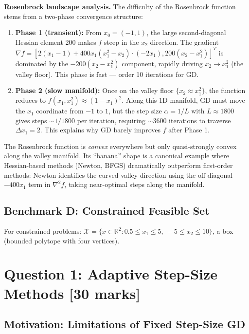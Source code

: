 \documentclass[11pt,a4paper]{article}
\theoremstyle{definition}
\begin{document}
\noindent\textbf{Rosenbrock landscape analysis.} The difficulty of the Rosenbrock function stems from a two-phase convergence structure:
\begin{enumerate}
\item \textbf{Phase 1 (transient):} From $x_0 = (-1,1)$, the large second-diagonal Hessian element $200$ makes $f$ steep in the $x_2$ direction. The gradient $\nabla f = [2(x_1-1) + 400x_1(x_1^2-x_2)\cdot(-2x_1), 200(x_2-x_1^2)]^T$ is dominated by the $-200(x_2-x_1^2)$ component, rapidly driving $x_2 \to x_1^2$ (the valley floor). This phase is fast --- order 10 iterations for GD.
\item \textbf{Phase 2 (slow manifold):} Once on the valley floor $\{x_2 \approx x_1^2\}$, the function reduces to $f(x_1, x_1^2) \approx (1-x_1)^2$. Along this 1D manifold, GD must move the $x_1$ coordinate from $-1$ to $1$, but the step size $\alpha = 1/L$ with $L \approx 1800$ gives steps $\sim 1/1800$ per iteration, requiring $\sim 3600$ iterations to traverse $\Delta x_1 = 2$. This explains why GD barely improves $f$ after Phase 1.
\end{enumerate}
The Rosenbrock function is \emph{convex} everywhere but only quasi-strongly convex along the valley manifold. Its ``banana'' shape is a canonical example where Hessian-based methods (Newton, BFGS) dramatically outperform first-order methods: Newton identifies the curved valley direction using the off-diagonal $-400x_1$ term in $\nabla^2 f$, taking near-optimal steps along the manifold.

\subsection{Benchmark D: Constrained Feasible Set}
For constrained problems: $\mathcal{X} = \{x \in \mathbb{R}^2 : 0.5 \leq x_1 \leq 5,\ -5 \leq x_2 \leq 10\}$, a box (bounded polytope with four vertices).

\section{Question 1: Adaptive Step-Size Methods \hfill [30 marks]}
\label{sec:q1}

\subsection{Motivation: Limitations of Fixed Step-Size GD}
\end{document}
